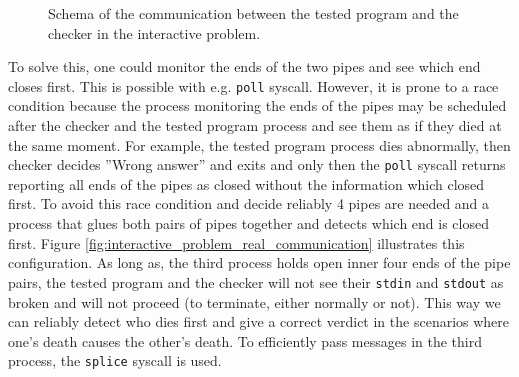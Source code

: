 \documentclass[en]{pracamgr}
\begin{document}
\begin{figure}[h]
\tikzset{>=latex} %
\centering
{}
\caption{Schema of the communication between the tested program and the checker in the interactive problem.}
\label{fig:intaractive_problem_communication_schema}
\end{figure}

To solve this, one could monitor the ends of the two pipes and see which end closes first. This is possible with e.g. \texttt{poll} syscall. However, it is prone to a race condition because the process monitoring the ends of the pipes may be scheduled after the checker and the tested program process and see them as if they died at the same moment. For example, the tested program process dies abnormally, then checker decides ''Wrong answer'' and exits and only then the \texttt{poll} syscall returns reporting all ends of the pipes as closed without the information which closed first. To avoid this race condition and decide reliably 4 pipes are needed and a process that glues both pairs of pipes together and detects which end is closed first. Figure \ref{fig:interactive_problem_real_communication} illustrates this configuration. As long as, the third process holds open inner four ends of the pipe pairs, the tested program and the checker will not see their \texttt{stdin} and \texttt{stdout} as broken and will not proceed (to terminate, either normally or not). This way we can reliably detect who dies first and give a correct verdict in the scenarios where one's death causes the other's death. To efficiently pass messages in the third process, the \texttt{splice} syscall is used.
\end{document}
